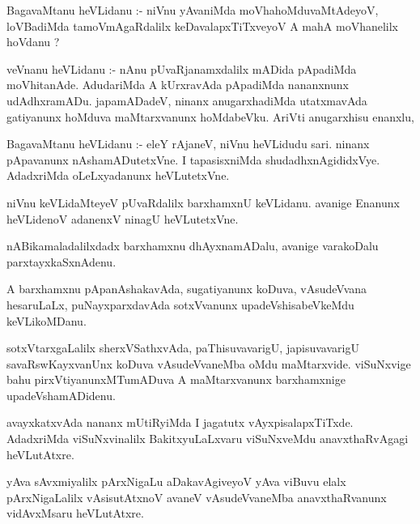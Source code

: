 \documentclass{article}
\begin{document}
\begin{mn}
BagavaMtanu  heVLidanu :- niVnu yAvaniMda moVhahoMduvaMtAdeyoV,  loVBadiMda 
tamoVmAgaRdalilx  keDavalapxTiTxveyoV A mahA moVhanelilx hoVdanu ?
\end{mn}

\begin{mn}
veVnanu heVLidanu :- nAnu pUvaRjanamxdalilx mADida  pApadiMda moVhitanAde.  
AdudariMda A kUrxravAda pApadiMda nananxnunx udAdhxramADu.  japamADadeV,  ninanx 
anugarxhadiMda utatxmavAda gatiyanunx hoMduva maMtarxvanunx hoMdabeVku.  AriVti anugarxhisu enanxlu,
\end{mn}

\begin{mn}
BagavaMtanu heVLidanu :- eleY rAjaneV, niVnu heVLidudu sari.  ninanx pApavanunx 
nAshamADutetxVne.  I tapasisxniMda  shudadhxnAgididxVye.  AdadxriMda oLeLxyadanunx heVLutetxVne.
\end{mn}

\begin{mn}
niVnu keVLidaMteyeV pUvaRdalilx barxhamxnU keVLidanu. avanige Enanunx heVLidenoV adanenxV ninagU heVLutetxVne.
\end{mn}

\begin{mn}
nABikamaladalilxdadx  barxhamxnu dhAyxnamADalu, avanige varakoDalu  parxtayxkaSxnAdenu.
\end{mn}

\begin{mn}
A barxhamxnu pApanAshakavAda, sugatiyanunx koDuva, vAsudeVvana hesaruLaLx, 
puNayxparxdavAda  sotxVvanunx upadeVshisabeVkeMdu keVLikoMDanu. 
\end{mn}

\begin{mn}
sotxVtarxgaLalilx sherxVSathxvAda, paThisuvavarigU,  japisuvavarigU 
savaRswKayxvanUnx koDuva vAsudeVvaneMba oMdu maMtarxvide.  viSuNxvige 
bahu pirxVtiyanunxMTumADuva A maMtarxvanunx barxhamxnige upadeVshamADidenu.
\end{mn}

\begin{mn}
avayxkatxvAda nananx mUtiRyiMda I jagatutx vAyxpisalapxTiTxde. AdadxriMda 
viSuNxvinalilx BakitxyuLaLxvaru viSuNxveMdu anavxthaRvAgagi heVLutAtxre. 
\end{mn}

\begin{mn}
yAva sAvxmiyalilx pArxNigaLu aDakavAgiveyoV yAva viBuvu elalx pArxNigaLalilx 
vAsisutAtxnoV avaneV vAsudeVvaneMba anavxthaRvanunx vidAvxMsaru heVLutAtxre.
\end{mn}
\end{document}
